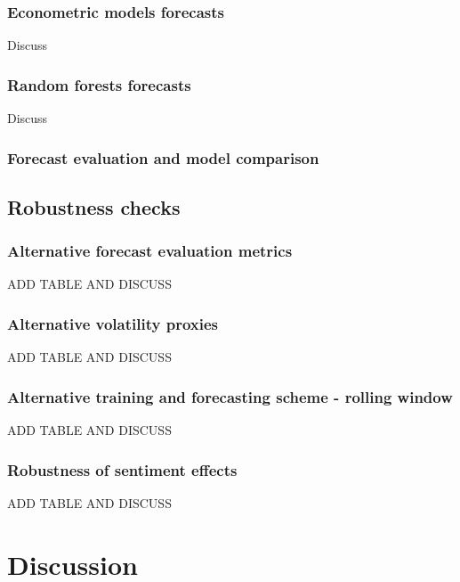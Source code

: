 \documentclass[12pt]{report}
\begin{document}
\subsection{Econometric models forecasts}
Discuss
\subsection{Random forests forecasts}
Discuss
\subsection{Forecast evaluation and model comparison}



\section{Robustness checks}
\subsection{Alternative forecast evaluation metrics}
ADD TABLE AND DISCUSS
%
\subsection{Alternative volatility proxies}
%
ADD TABLE AND DISCUSS
\subsection{Alternative training and forecasting scheme - rolling window}
%
ADD TABLE AND DISCUSS
\subsection{Robustness of sentiment effects}
%
ADD TABLE AND DISCUSS

\chapter{Discussion}
\end{document}
